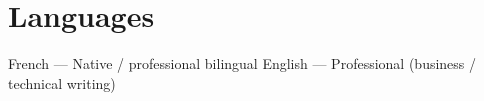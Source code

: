 \section{Languages}

{\small French --- Native / professional bilingual \quad\textbar\quad
English --- Professional (business / technical writing)}
